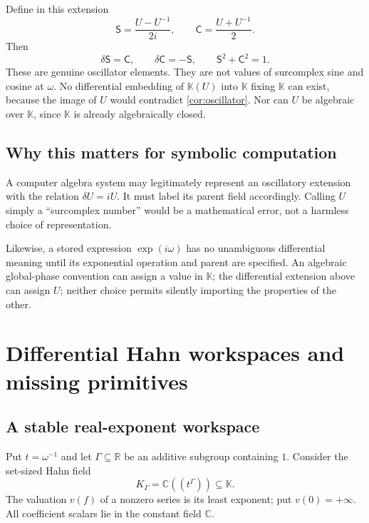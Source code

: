 \documentclass[11pt,letterpaper]{article}
\numberwithin{equation}{section}
\theoremstyle{definition}
\theoremstyle{remark}
\newcommand{\K}{\mathbb K}
\newcommand{\R}{\mathbb R}
\newcommand{\C}{\mathbb C}
\begin{document}
Define in this extension
\[
 \mathsf S=\frac{U-U^{-1}}{2i},\qquad \mathsf C=\frac{U+U^{-1}}{2}.
\]
Then
\[
 \delta\mathsf S=\mathsf C,\qquad\delta\mathsf C=-\mathsf S,
 \qquad \mathsf S^2+\mathsf C^2=1.
\]
These are genuine oscillator elements. They are not values of surcomplex sine and cosine at $\omega$. No differential embedding of $\K(U)$ into $\K$ fixing $\K$ can exist, because the image of $U$ would contradict \cref{cor:oscillator}. Nor can $U$ be algebraic over $\K$, since $\K$ is already algebraically closed.

\subsection{Why this matters for symbolic computation}
A computer algebra system may legitimately represent an oscillatory extension with the relation $\delta U=iU$. It must label its parent field accordingly. Calling $U$ simply a ``surcomplex number'' would be a mathematical error, not a harmless choice of representation.

Likewise, a stored expression $\exp(i\omega)$ has no unambiguous differential meaning until its exponential operation and parent are specified. An algebraic global-phase convention can assign a value in $\K$; the differential extension above can assign $U$; neither choice permits silently importing the properties of the other.

\section{Differential Hahn workspaces and missing primitives}\label{sec:workspaces}

\subsection{A stable real-exponent workspace}
Put $t=\omega^{-1}$ and let $\Gamma\subseteq\R$ be an additive subgroup containing $1$. Consider the set-sized Hahn field
\[
 K_\Gamma=\C((t^\Gamma))\subseteq\K.
\]
The valuation $v(f)$ of a nonzero series is its least exponent; put $v(0)=+\infty$. All coefficient scalars lie in the constant field $\C$.
\end{document}
